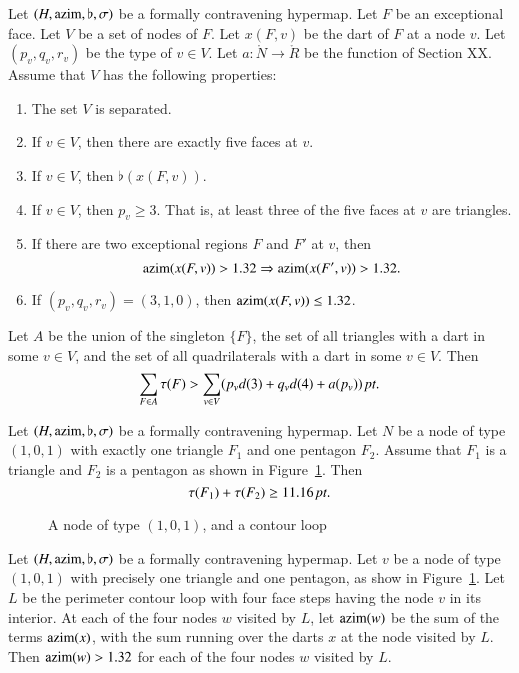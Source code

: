 \begin{lemma} \label{lemma:excess-1:bis}
Let $(H,{\operatorname{azim}},\flat,\sigma)$ be a formally contravening hypermap.
Let $F$ be an exceptional face.  Let $V$ be a set of nodes of $F$.
Let $x(F,v)$ be the dart of $F$ at a node $v$.  Let $(p_v,q_v,r_v)$
be the type of $v\in V$.   Let $a:\ring{N}\to\ring{R}$ be the
function of Section XX. Assume that $V$ has the following
properties:
    \begin{enumerate}
        \item The set $V$ is separated.
        \item If $v\in V$, then there are exactly five faces at
        $v$.
        \item If $v\in V$, then $\flat(x(F,v))$.
        \item If $v\in V$, then $p_v\ge 3$.  That is, at least
        three of the five faces at $v$ are triangles.
        \item If there are two exceptional regions $F$ and $F'$ at
        $v$, then
            $${\operatorname{azim}}(x(F,v)) > 1.32 \Rightarrow {\operatorname{azim}}(x(F',v)) > 1.32.$$
        \item If $(p_v,q_v,r_v)=(3,1,0)$, then ${\operatorname{azim}}(x(F,v))\le 1.32$.
    \end{enumerate}
Let $A$ be the union of the singleton $\{F\}$, the set of all
triangles with a dart in some $v\in V$, and the set of all
quadrilaterals with a dart in some $v\in V$. Then
    $$\sum_{F\in A}\tau(F) > \sum_{v\in V} (p_v d(3) + q_v d(4) + a
    (p_v))\,\hbox{\it pt}.$$
\end{lemma}

\begin{lemma}\label{lemma:11.16:bis}
Let $(H,{\operatorname{azim}},\flat,\sigma)$ be a formally contravening hypermap.
Let $N$ be a node of type $(1,0,1)$ with exactly one triangle $F_1$
and one pentagon $F_2$. Assume that $F_1$ is a triangle and $F_2$ is
a pentagon as shown in Figure~\ref{fig:no4circuit:bis}. Then
    $$\tau(F_1) + \tau(F_2) \ge 11.16\,\hbox{\it pt}.$$
\end{lemma}

\begin{figure}[htb]
  \centering
  \caption{A node of type $(1,0,1)$, and a contour loop}
  \label{fig:no4circuit:bis}
\end{figure}

\begin{lemma}\label{lemma:nobad4}
Let $(H,{\operatorname{azim}},\flat,\sigma)$ be a formally contravening hypermap.
Let $v$ be a node of type $(1,0,1)$ with precisely one triangle and
one pentagon, as show in Figure~\ref{fig:no4circuit:bis}. Let $L$ be
the perimeter contour loop with four face steps having the node $v$
in its interior.  At each of the four nodes $w$ visited by $L$, let
${\operatorname{azim}}(w)$ be the sum of the terms ${\operatorname{azim}}(x)$, with the sum running
over the darts $x$ at the node visited by $L$.  Then
    ${\operatorname{azim}}(w) > 1.32$
for each of the four nodes $w$ visited by $L$.
\end{lemma}

